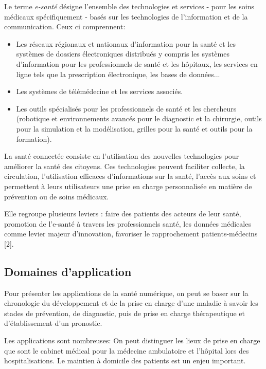 \documentclass[12pt]{article}
\begin{document}
Le terme \textit{e-santé} désigne l'ensemble des technologies et services - pour les soins médicaux spécifiquement - basés sur les technologies de l'information et de la communication. 
Ceux ci comprennent:
\begin{itemize}
	\item Les réseaux régionaux et nationaux d'information pour la santé et les systèmes de dossiers électroniques distribués y compris les systèmes d'information pour les professionnels de santé et les hôpitaux, les services en ligne tels que la prescription électronique, les bases de données...
	\item Les systèmes de télémédecine et les services associés.
	\item Les outils spécialisés pour les professionnels de santé et les chercheurs (robotique et environnements avancés pour le diagnostic et la chirurgie, outils pour la simulation et la modélisation, grilles pour la santé et outils pour la formation).
\end{itemize}

La santé connectée consiste en l’utilisation des nouvelles technologies pour améliorer la santé des citoyens. Ces technologies peuvent faciliter collecte, la circulation, l'utilisation efficaces d'informations sur la santé, l’accès aux soins et permettent à leurs utilisateurs une prise en charge personnalisée en matière de prévention ou de soins médicaux.

Elle regroupe plusieurs leviers : faire des patients des acteurs de leur santé, promotion de l’e-santé à travers les professionnels santé, les données médicales comme levier majeur d’innovation, favoriser le rapprochement patients-médecins [2].

\subsection{Domaines d’application}
Pour présenter les applications de la santé numérique, on peut se baser sur la chronologie du développement et de la prise en charge d’une maladie à savoir les stades de prévention, de diagnostic, puis de prise en charge thérapeutique et d’établissement d’un pronostic.

Les applications sont nombreuses: On peut distinguer les lieux de prise en charge que sont le cabinet médical pour la médecine ambulatoire et l’hôpital lors des hospitalisations. Le maintien à domicile des patients est un enjeu important.
\end{document}
